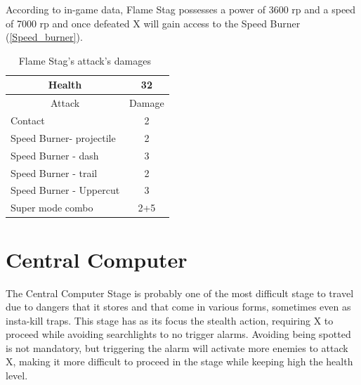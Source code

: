 According to in-game data, Flame Stag possesses a power of 3600 rp and a speed of 7000 rp and once defeated X will gain access to the Speed Burner (\ref{Speed_burner}).
\begin{table}[htp]
	\centering
	\begin{tabular}[h]{l c}
		
		\toprule
		\multicolumn{1}{c}{Health}  & 32 \\
		\midrule
		\multicolumn{1}{c}{Attack} & \multicolumn{1}{c}{Damage}\\
		Contact & 2 \\
		Speed Burner- projectile& 2\\
		Speed Burner - dash& 3\\
		Speed Burner - trail& 2\\
		Speed Burner - Uppercut& 3\\
		Super mode combo & 2+5\\
		\bottomrule
	\end{tabular}
	\caption{Flame Stag's attack's damages~\cite{wiki:Flame_stag}}
\end{table}
\section{Central Computer}
The Central Computer Stage is probably one of the most difficult stage to travel due to dangers that it stores and that come in various forms, sometimes even as insta-kill traps. This stage has as its focus the stealth action, requiring X to proceed while avoiding searchlights to no trigger alarms. Avoiding being spotted is not mandatory, but triggering the alarm will activate more enemies to attack X, making it more difficult to proceed in the stage while keeping high the health level.

